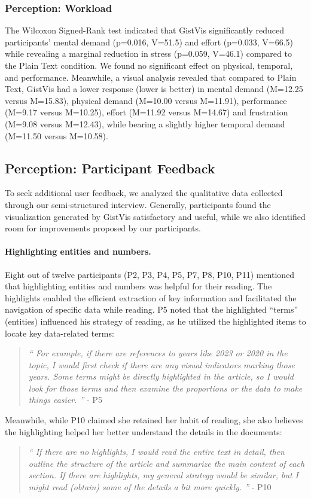 \subsubsection{Perception: Workload}
The Wilcoxon Signed-Rank test indicated that GistVis significantly reduced participants' mental demand (p=0.016, V=51.5) and effort (p=0.033, V=66.5) while revealing a marginal reduction in stress (p=0.059, V=46.1) compared to the Plain Text condition. We found no significant effect on physical, temporal, and performance. Meanwhile, a visual analysis revealed that compared to Plain Text, GistVis had a lower response (lower is better) in mental demand (M=12.25 versus M=15.83), physical demand (M=10.00 versus M=11.91), performance (M=9.17 versus M=10.25), effort (M=11.92 versus M=14.67) and frustration (M=9.08 versus M=12.43), while bearing a slightly higher temporal demand (M=11.50 versus M=10.58).

\subsection{Perception: Participant Feedback}
To seek additional user feedback, we analyzed the qualitative data collected through our semi-structured interview. Generally, participants found the visualization generated by GistVis satisfactory and useful, while we also identified room for improvements proposed by our participants. 

\paragraph{Highlighting entities and numbers.}
Eight out of twelve participants (P2, P3, P4, P5, P7, P8, P10, P11) mentioned that highlighting entities and numbers was helpful for their reading. The highlights enabled the efficient extraction of key information and facilitated the navigation of specific data while reading. P5 noted that the highlighted ``terms'' (entities) influenced his strategy of reading, as he utilized the highlighted items to locate key data-related terms:
\begin{quote}
\textit{``
For example, if there are references to years like 2023 or 2020 in the topic, I would first check if there are any visual indicators marking those years. Some terms might be directly highlighted in the article, so I would look for those terms and then examine the proportions or the data to make things easier.
    ''} - P5
\end{quote}
Meanwhile, while P10 claimed she retained her habit of reading, she also believes the highlighting helped her better understand the details in the documents:
\begin{quote}
\textit{``
If there are no highlights, I would read the entire text in detail, then outline the structure of the article and summarize the main content of each section. If there are highlights, my general strategy would be similar, but I might read (obtain) some of the details a bit more quickly.
    ''} - P10
\end{quote}

